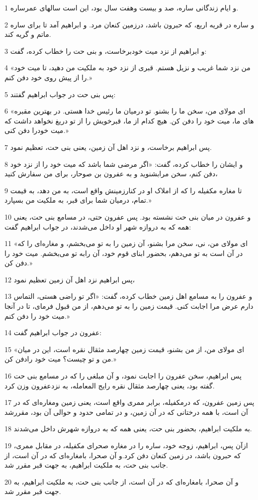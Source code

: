 \par 1 و ایام زندگانی ساره، صد و بیست وهفت سال بود، این است سالهای عمرساره.
\par 2 و ساره در قریه اربع، که حبرون باشد، درزمین کنعان مرد. و ابراهیم آمد تا برای ساره ماتم و گریه کند.
\par 3 و ابراهیم از نزد میت خودبرخاست، و بنی حت را خطاب کرده، گفت:
\par 4 «من نزد شما غریب و نزیل هستم. قبری از نزد خود به ملکیت من دهید، تا میت خود را از پیش روی خود دفن کنم.»
\par 5 پس بنی حت در جواب ابراهیم گفتند:
\par 6 «ای مولای من، سخن ما را بشنو. تو درمیان ما رئیس خدا هستی. در بهترین مقبره های ما، میت خود را دفن کن. هیچ کدام از ما، قبرخویش را از تو دریغ نخواهد داشت که میت خودرا دفن کنی.» 
\par 7 پس ابراهیم برخاست، و نزد اهل آن زمین، یعنی بنی حت، تعظیم نمود.
\par 8 و ایشان را خطاب کرده، گفت: «اگر مرضی شما باشد که میت خود را از نزد خود دفن کنم، سخن مرابشنوید و به عفرون بن صوحار، برای من سفارش کنید،
\par 9 تا مغاره مکفیله را که از املاک او در کنارزمینش واقع است، به من دهد، به قیمت تمام، درمیان شما برای قبر، به ملکیت من بسپارد.»
\par 10 و عفرون در میان بنی حت نشسته بود. پس عفرون حتی، در مسامع بنی حت، یعنی همه که به دروازه شهر او داخل می‌شدند، در جواب ابراهیم گفت:
\par 11 «ای مولای من، نی، سخن مرا بشنو، آن زمین را به تو می‌بخشم، و مغاره‌ای را که در آن است به تو می‌دهم، بحضور ابنای قوم خود، آن رابه تو می‌بخشم. میت خود را دفن کن.»
\par 12 پس ابراهیم نزد اهل آن زمین تعظیم نمود،
\par 13 و عفرون را به مسامع اهل زمین خطاب کرده، گفت: «اگر تو راضی هستی، التماس دارم عرض مرا اجابت کنی. قیمت زمین را به تو می‌دهم، از من قبول فرمای، تا در آنجا میت خود را دفن کنم.»
\par 14 عفرون در جواب ابراهیم گفت:
\par 15 «ای مولای من، از من بشنو، قیمت زمین چهارصد مثقال نقره است، این در میان من و تو چیست؟ میت خود رادفن کن.»
\par 16 پس ابراهیم، سخن عفرون را اجابت نمود، و آن مبلغی را که در مسامع بنی حت گفته بود، یعنی چهارصد مثقال نقره رایج المعامله، به نزدعفرون وزن کرد.
\par 17 پس زمین عفرون، که درمکفیله، برابر ممری واقع است، یعنی زمین ومغاره‌ای که در آن است، با همه درختانی که در آن زمین، و در تمامی حدود و حوالی آن بود، مقررشد
\par 18 به ملکیت ابراهیم، بحضور بنی حت، یعنی همه که به دروازه شهرش داخل می‌شدند.
\par 19 ازآن پس، ابراهیم، زوجه خود، ساره را در مغاره صحرای مکفیله، در مقابل ممری، که حبرون باشد، در زمین کنعان دفن کرد.و آن صحرا، بامغاره‌ای که در آن است، از جانب بنی حت، به ملکیت ابراهیم، به جهت قبر مقرر شد.
\par 20 و آن صحرا، بامغاره‌ای که در آن است، از جانب بنی حت، به ملکیت ابراهیم، به جهت قبر مقرر شد.
 
